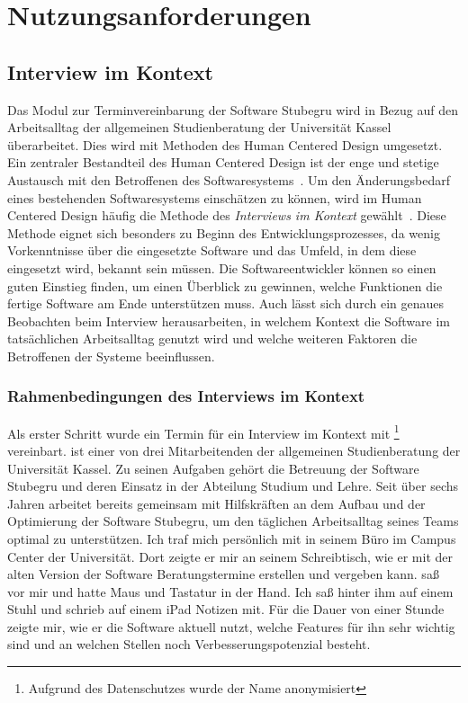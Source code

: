 \chapter{Nutzungsanforderungen}
\label{chapter:user-requirements}

\section{Interview im Kontext}
\label{subsection:IIK}

Das Modul zur Terminvereinbarung der Software Stubegru wird in Bezug auf den
Arbeitsalltag der allgemeinen Studienberatung der Universität Kassel
überarbeitet. Dies wird mit Methoden des Human Centered Design umgesetzt. Ein
zentraler Bestandteil des Human Centered Design ist der enge und stetige
Austausch mit den Betroffenen des Softwaresystems~\cite{hci}. Um den
Änderungsbedarf eines bestehenden Softwaresystems einschätzen zu können, wird
im Human Centered Design häufig die Methode des \textit{Interviews im Kontext}
gewählt~\cite{contextualDesign}. Diese Methode eignet sich besonders zu Beginn
des Entwicklungsprozesses, da wenig Vorkenntnisse über die eingesetzte Software
und das Umfeld, in dem diese eingesetzt wird, bekannt sein müssen. Die
Softwareentwickler können so einen guten Einstieg finden, um einen Überblick zu
gewinnen, welche Funktionen die fertige Software am Ende unterstützen muss.
Auch lässt sich durch ein genaues Beobachten beim Interview herausarbeiten, in
welchem Kontext die Software im tatsächlichen Arbeitsalltag genutzt wird und
welche weiteren Faktoren die Betroffenen der Systeme beeinflussen.

\subsection*{Rahmenbedingungen des Interviews im Kontext}
Als erster Schritt wurde ein Termin für ein Interview im Kontext mit
\ipName\footnote{Aufgrund des Datenschutzes wurde der Name anonymisiert}
vereinbart. \ipName ist einer von drei Mitarbeitenden der allgemeinen
Studienberatung der Universität Kassel. Zu seinen Aufgaben gehört die Betreuung
der Software Stubegru und deren Einsatz in der Abteilung Studium und Lehre.
Seit über sechs Jahren arbeitet \ipName bereits gemeinsam mit Hilfskräften an
dem Aufbau und der Optimierung der Software Stubegru, um den täglichen
Arbeitsalltag seines Teams optimal zu unterstützen. Ich traf mich persönlich
mit \ipName in seinem Büro im Campus Center der Universität. Dort zeigte er mir
an seinem Schreibtisch, wie er mit der alten Version der Software
Beratungstermine erstellen und vergeben kann. \ipName saß vor mir und hatte
Maus und Tastatur in der Hand. Ich saß hinter ihm auf einem Stuhl und schrieb
auf einem iPad Notizen mit. Für die Dauer von einer Stunde zeigte \ipName mir,
wie er die Software aktuell nutzt, welche Features für ihn sehr wichtig sind
und an welchen Stellen noch Verbesserungspotenzial besteht.

